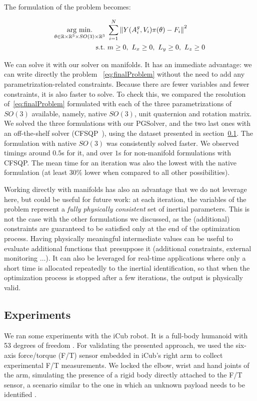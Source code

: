The formulation of the problem becomes:

\begin{equation}
\begin{aligned}
\label{eq:finalProblem}
    \operatorname*{arg\ min.}_{\theta \in \mathbb{R}\times\mathbb{R}^3\times SO(3) \times \mathbb{R}^3} &\ \sum_{i = 1}^N \left\| Y(A^g_i, V_i) \pi(\theta) - F_i \right\|^2 \\
    \mbox{s.t.} &\ m \geq 0,\ L_x \geq 0,\ L_y \geq 0,\ L_z \geq 0
\end{aligned}
\end{equation}

We can solve it with our solver on manifolds.
It has an immediate advantage: we can write directly the problem ~\eqref{eq:finalProblem} without the need to add any parametrization-related constraints.
Because there are fewer variables and fewer constraints, it is also faster to solve.
To check this, we compared the resolution of~\eqref{eq:finalProblem} formulated with each of the three parametrizations of $SO(3)$ available, namely, native $SO(3)$, unit quaternion and rotation matrix.
We solved the three formulations with our PGSolver, and the two last ones with an off-the-shelf solver (CFSQP~\cite{cfsqp:manual}), using the dataset presented in section~\ref{sub:experiments}.
The formulation with native $SO(3)$ was consistently solved faster.
We observed timings around $0.5$s for it, and over $1$s for non-manifold formulations with CFSQP.
The mean time for an iteration was also the lowest with the native formulation (at least $30\%$ lower when compared to all other possibilities).

Working directly with manifolds has also an advantage that we do not leverage here, but could be useful for future work: at each iteration, the variables of the problem represent a \emph{fully physically consistent} set of inertial parameters.
This is not the case with the other formulations we discussed, as the (additional) constraints are guaranteed to be satisfied only at the end of the optimization process.
Having physically meaningful intermediate values can be useful to evaluate additional functions that presuppose it (additional constraints, external monitoring $\ldots$).
It can also be leveraged for real-time applications where only a short time is allocated repeatedly to the inertial identification, so that when the optimization process is stopped after a few iterations, the output is physically valid.

\subsection{Experiments}
\label{sub:experiments}
We ran some experiments with the iCub robot.
It is a full-body humanoid with 53 degrees of freedom \cite{metta2010icub}.
For validating the presented approach, we used the six-axis force/torque (F/T) sensor embedded in iCub's right arm to collect experimental F/T measurements.
We locked the elbow, wrist and hand joints of the arm, simulating the presence of a rigid body directly attached to the F/T sensor, a scenario similar to the one in which an unknown payload needs to be identified \cite{kubus2008line}.


